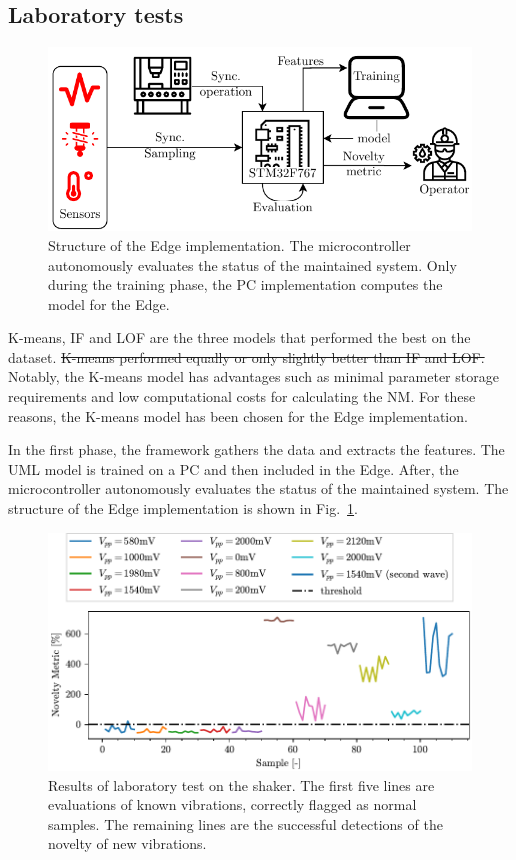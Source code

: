 \documentclass[a4paper, 10pt, conference, oneside]{ieeeconf}
\providecommand{\DIFdeltex}[1]{{\protect\color{red}\sout{#1}}}                      %
\providecommand{\DIFdelbegin}{} %
\providecommand{\DIFdelend}{} %
\providecommand{\DIFdel}[1]{\texorpdfstring{\DIFdeltex{#1}}{}} %
\newcommand{\DIFscaledelfig}{0.5}
\newlength{\DIFdelgraphicswidth} %
\newlength{\DIFdelgraphicsheight} %
\newcommand{\DIFdelincludegraphics}[2][]{%
\sbox{\DIFdelgraphicsbox}{\DIFOincludegraphics[#1]{#2}}%
\settoboxwidth{\DIFdelgraphicswidth}{\DIFdelgraphicsbox} %
\settoboxtotalheight{\DIFdelgraphicsheight}{\DIFdelgraphicsbox} %
\scalebox{\DIFscaledelfig}{%
\parbox[b]{\DIFdelgraphicswidth}{\usebox{\DIFdelgraphicsbox}\\[-\baselineskip] \rule{\DIFdelgraphicswidth}{0em}}\llap{\resizebox{\DIFdelgraphicswidth}{\DIFdelgraphicsheight}{%
\setlength{\unitlength}{\DIFdelgraphicswidth}%
\begin{picture}(1,1)%
\thicklines\linethickness{2pt} %
{\color[rgb]{1,0,0}\put(0,0){\framebox(1,1){}}}%
{\color[rgb]{1,0,0}\put(0,0){\line( 1,1){1}}}%
{\color[rgb]{1,0,0}\put(0,1){\line(1,-1){1}}}%
\end{picture}%
}\hspace*{3pt}}} %
} %
\DeclareRobustCommand{\DIFdelbegin}{\DIFOdelbegin \let\includegraphics\DIFdelincludegraphics} %
\DeclareRobustCommand{\DIFdelend}{\DIFOaddend \let\includegraphics\DIFOincludegraphics} %
\begin{document}
\subsection{Laboratory tests}

\begin{figure}
    \includegraphics[width=\linewidth]{images/EmbeddedStructure.pdf}
    \caption{Structure of the Edge implementation. The microcontroller autonomously evaluates the status of the maintained system. Only during the training phase, the PC implementation computes the model for the Edge.}
    \label{fig:embedded}
\end{figure}

K-means, IF and LOF are the three models that performed the best on the dataset. \DIFdelbegin \DIFdel{K-means performed equally or only slightly better than IF and LOF. }\DIFdelend Notably, the K-means model has advantages such as minimal parameter storage requirements and low computational costs for calculating the NM. For these reasons, the K-means model has been chosen for the Edge implementation.

In the first phase, the framework gathers the data and extracts the features. The UML model is trained on a PC and then included in the Edge. After, the microcontroller autonomously evaluates the status of the maintained system. The structure of the Edge implementation is shown in Fig.~\ref{fig:embedded}. 

\begin{figure}
    \includegraphics[width=\linewidth]{images/Test02_LOF.pdf}
    \caption{Results of laboratory test on the shaker. The first five lines are evaluations of known vibrations, correctly flagged as normal samples. The remaining lines are the successful detections of the novelty of new vibrations.}
    \label{fig:shaker}
\end{figure}
\end{document}
